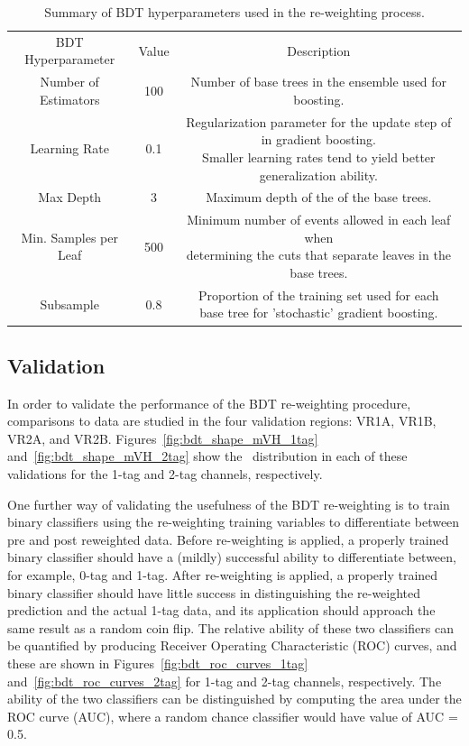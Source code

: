 \begin{table}[htbp!]
\centering
\begin{tabular}{c|c|c}
\hline
BDT Hyperparameter & Value & Description \\
\hhline{|=|=|=|}
Number of Estimators & 100 & Number of base trees in the ensemble used for boosting. \\
\hline
Learning Rate & 0.1 & \makecell{Regularization parameter for the update step of in gradient boosting. \\ Smaller learning rates tend to yield better generalization ability.} \\
\hline
Max Depth & 3 & Maximum depth of the of the base trees. \\
\hline
Min. Samples per Leaf & 500 & \makecell{Minimum number of events allowed in each leaf when \\ determining the cuts that separate leaves in the base trees.} \\
\hline
Subsample & 0.8 & \makecell{Proportion of the training set used for each \\ base tree for 'stochastic' gradient boosting.} \\
\hline
\end{tabular}
\caption{Summary of BDT hyperparameters used in the re-weighting process.}
\label{tab:bdt_params}
\end{table}

\subsection{Validation}
\label{sec:bkg-validation}

In order to validate the performance of the BDT re-weighting procedure, comparisons to data are studied in the four validation regions: VR1A, VR1B, VR2A, and VR2B.
Figures~\ref{fig:bdt_shape_mVH_1tag} and~\ref{fig:bdt_shape_mVH_2tag} show the \mvh\ distribution in each of these validations for the 1-tag and 2-tag channels, respectively.

One further way of validating the usefulness of the BDT re-weighting is to train binary classifiers using the re-weighting training variables to differentiate between pre and post reweighted data.
Before re-weighting is applied, a properly trained binary classifier should have a (mildly) successful ability to differentiate between, for example, 0-tag and 1-tag.
After re-weighting is applied, a properly trained binary classifier should have little success in distinguishing the re-weighted prediction and the actual 1-tag data, and its application should approach the same result as a random coin flip.
The relative ability of these two classifiers can be quantified by producing Receiver Operating Characteristic (ROC) curves, and these are shown in Figures~\ref{fig:bdt_roc_curves_1tag} and~\ref{fig:bdt_roc_curves_2tag} for 1-tag and 2-tag channels, respectively.
The ability of the two classifiers can be distinguished by computing the area under the ROC curve (AUC), where a random chance classifier would have value of AUC = 0.5.

